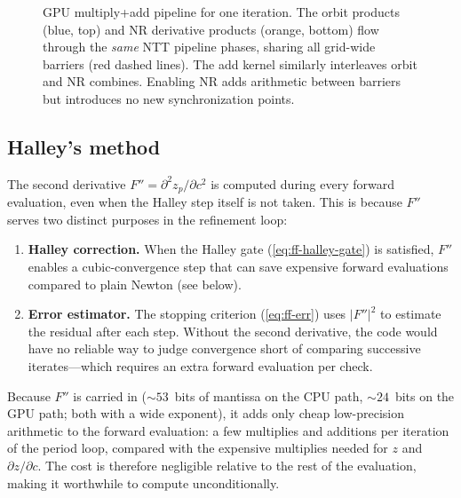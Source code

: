 \begin{figure}[!htbp]
\caption[GPU multiply+add pipeline with shared barriers]{GPU multiply+add pipeline for one iteration.  The orbit
  products (blue, top) and NR derivative products (orange, bottom) flow
  through the \emph{same} NTT pipeline phases, sharing all grid-wide
  barriers (red dashed lines).  The add kernel similarly interleaves
  orbit and NR combines.  Enabling NR adds arithmetic between barriers
  but introduces no new synchronization points.}
\label{fig:ntt-pipeline}
\end{figure}

\subsection{Halley's method}
\label{subsec:ff-halley}

The second derivative $F'' = \partial^2 z_p/\partial c^2$ is computed during
every forward evaluation, even when the Halley step itself is not taken.  This
is because $F''$ serves two distinct purposes in the refinement loop:

\begin{enumerate}
\item \textbf{Halley correction.}  When the Halley gate (\cref{eq:ff-halley-gate})
  is satisfied, $F''$ enables a cubic-convergence step that can save expensive
  forward evaluations compared to plain Newton (see below).
\item \textbf{Error estimator.}  The stopping criterion
  (\cref{eq:ff-err}) uses $|F''|^2$ to estimate the residual after
  each step.  Without the second derivative, the code would have no reliable
  way to judge convergence short of comparing successive iterates---which
  requires an extra forward evaluation per check.
\end{enumerate}

Because $F''$ is carried in  (${\sim}53$~bits of
mantissa on the CPU path, ${\sim}24$~bits on the GPU path; both with a
wide exponent), it adds only cheap low-precision arithmetic to
the forward evaluation: a few  multiplies and additions per
iteration of the period loop, compared with the expensive 
multiplies needed for $z$ and $\partial z/\partial c$.  The cost is therefore
negligible relative to the rest of the evaluation, making it worthwhile to
compute unconditionally.

